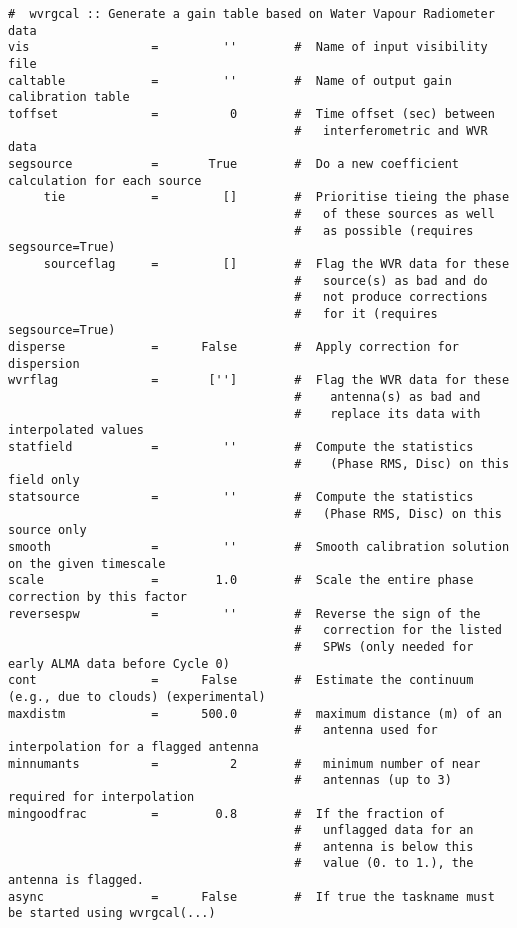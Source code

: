 \small
\begin{verbatim}
#  wvrgcal :: Generate a gain table based on Water Vapour Radiometer data
vis                 =         ''        #  Name of input visibility file
caltable            =         ''        #  Name of output gain calibration table
toffset             =          0        #  Time offset (sec) between
                                        #   interferometric and WVR data
segsource           =       True        #  Do a new coefficient calculation for each source
     tie            =         []        #  Prioritise tieing the phase
                                        #   of these sources as well
                                        #   as possible (requires segsource=True)
     sourceflag     =         []        #  Flag the WVR data for these
                                        #   source(s) as bad and do
                                        #   not produce corrections
                                        #   for it (requires segsource=True)
disperse            =      False        #  Apply correction for dispersion
wvrflag             =       ['']        #  Flag the WVR data for these
                                        #    antenna(s) as bad and
                                        #    replace its data with interpolated values
statfield           =         ''        #  Compute the statistics
                                        #    (Phase RMS, Disc) on this field only
statsource          =         ''        #  Compute the statistics
                                        #   (Phase RMS, Disc) on this source only
smooth              =         ''        #  Smooth calibration solution on the given timescale
scale               =        1.0        #  Scale the entire phase correction by this factor
reversespw          =         ''        #  Reverse the sign of the
                                        #   correction for the listed
                                        #   SPWs (only needed for early ALMA data before Cycle 0)
cont                =      False        #  Estimate the continuum (e.g., due to clouds) (experimental)
maxdistm            =      500.0        #  maximum distance (m) of an
                                        #   antenna used for interpolation for a flagged antenna
minnumants          =          2        #   minimum number of near
                                        #   antennas (up to 3) required for interpolation
mingoodfrac         =        0.8        #  If the fraction of
                                        #   unflagged data for an
                                        #   antenna is below this
                                        #   value (0. to 1.), the antenna is flagged.
async               =      False        #  If true the taskname must be started using wvrgcal(...)


\end{verbatim}
\normalsize

